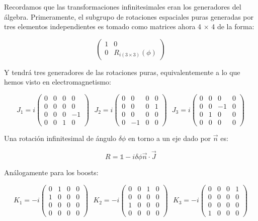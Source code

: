 Recordamos que las transformaciones infinitesimales eran los generadores del álgebra. Primeramente, el subgrupo de rotaciones espaciales puras generadas por tres elementos independientes es tomado como matrices ahora 4 $\times$ 4 de la forma:

$$\left (\begin{array}{cccc}
1 & 0 \\
0 & R_{i(3\times 3)}(\phi)
\end{array}\right )$$

Y tendrá tres generadores de las rotaciones puras, equivalentemente a lo que hemos visto en electromagnetismo:


$$J_1= i\left (\begin{array}{cccc}
0 & 0 &  0 &  0\\
0 & 0 &  0 & 0 \\
0 & 0 & 0 & -1\\
0 & 0 & 1 & 0
\end{array} \right )\ \ \ J_2= i\left (\begin{array}{cccc}
0 & 0 &  0 &  0\\
0 & 0 &  0 & 1 \\
0 & 0 & 0 & 0\\
0 & -1 & 0 & 0
\end{array} \right )\ \ \ J_3= i\left (\begin{array}{cccc}
0 & 0 &  0 &  0\\
0 & 0 &  -1 & 0 \\
0 & 1 & 0 & 0\\
0 & 0 & 0 & 0
\end{array} \right )$$


Una rotación infinitesimal de ángulo $\delta \phi$ en torno a un eje dado por $\Vec{n}$ es:

$$R=\mathds{1}-i\delta \phi \Vec{n}\cdot \Vec{J}$$

Análogamente para los boosts:

$$K_1= -i\left (\begin{array}{cccc}
0 & 1 &  0 &  0\\
1 & 0 &  0 & 0 \\
0 & 0 & 0 & 0\\
0 & 0 & 0 & 0
\end{array} \right ) \ \ \ K_2= -i\left (\begin{array}{cccc}
0 & 0 &  1 &  0\\
0 & 0 &  0 & 0 \\
1 & 0 & 0 & 0\\
0 & 0 & 0 & 0
\end{array} \right ) \ \ \ K_3= -i\left (\begin{array}{cccc}
0 & 0 &  0 &  1\\
0 & 0 &  0 & 0 \\
0 & 0 & 0 & 0\\
1 & 0 & 0 & 0
\end{array} \right )$$


